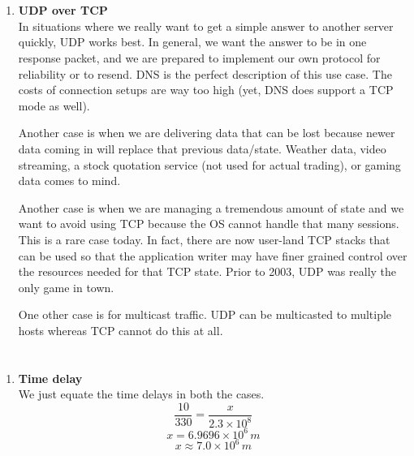 \documentclass[12pt]{article}
\begin{document}
\section{}
    \begin{enumerate}[label=(\alph*)]
        \item \textbf{UDP over TCP} \\
     In situations where we really want to get a simple answer to another server quickly, UDP works best. In general, we want the answer to be in one response packet, and we are prepared to implement our own protocol for reliability or to resend. DNS is the perfect description of this use case. The costs of connection setups are way too high (yet, DNS does support a TCP mode as well).
    
    Another case is when we are delivering data that can be lost because newer data coming in will replace that previous data/state. Weather data, video streaming, a stock quotation service (not used for actual trading), or gaming data comes to mind.
    
    Another case is when we are managing a tremendous amount of state and we want to avoid using TCP because the OS cannot handle that many sessions. This is a rare case today. In fact, there are now user-land TCP stacks that can be used so that the application writer may have finer grained control over the resources needed for that TCP state. Prior to 2003, UDP was really the only game in town.
    
    One other case is for multicast traffic. UDP can be multicasted to multiple hosts whereas TCP cannot do this at all.

    \end{enumerate}
    
\section{}
    \begin{enumerate}[label=(\alph*)]
    \item \textbf{Time delay} \\
    We just equate the time delays in both the cases.
        \begin{equation*}
            \frac{10}{330} = \frac{x}{2.3 \times 10^8}
        \end{equation*}
        \begin{equation*}
            x = 6.9696 \times 10^6 \, m
        \end{equation*}
        \begin{equation*}
            x \approx 7.0 \times 10^6 \,  m
        \end{equation*}
    \end{enumerate}
    
\end{document}
